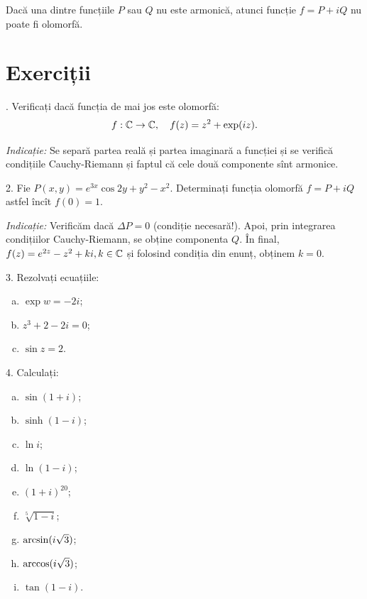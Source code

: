 \begin{corollary}\label{cor:not-olo}
  Dacă una dintre funcțiile $ P $ sau $ Q $ nu este armonică, atunci funcție
  $ f = P + iQ $ nu poate fi olomorfă.
\end{corollary}


\section{Exerciții}

\indent{}. Verificați dacă funcția de mai jos este olomorfă:
\[
  f : \mathbb{C} \to \mathbb{C}, \quad f(z) = z^2 + \exp(iz).
\]

\emph{Indicație:} Se separă partea reală și partea imaginară a funcției
și se verifică condițiile Cauchy-Riemann și faptul că cele două componente
sînt armonice.

\vspace{0.3cm}

2. Fie $ P(x, y) = e^{3x}\cos 2y + y^2 - x^2 $. Determinați funcția olomorfă
$ f = P + iQ $ astfel încît $ f(0) = 1 $.

\emph{Indicație:} Verificăm dacă $ \Delta P = 0 $ (condiție necesară!).
Apoi, prin integrarea condițiilor Cauchy-Riemann, se obține componenta
$ Q $. În final, $ f(z) = e^{2z} - z^2 + ki, k \in \mathbb{C} $ și folosind
condiția din enunț, obținem $ k = 0 $.

\vspace{0.3cm}

3. Rezolvați ecuațiile:
\begin{enumerate}[(a)]
\item $ \exp w = -2i $;
\item $ z^3 + 2 - 2i = 0 $;
\item $ \sin z = 2 $.
\end{enumerate}

\vspace{0.3cm}

4. Calculați:
\begin{enumerate}[(a)]
\item $ \sin(1 + i) $;
\item $ \sinh(1 - i) $;
\item $ \ln i $;
\item $ \ln(1 - i) $;
\item $ (1 + i)^{20} $;
\item $ \sqrt[5]{1 - i} $;
\item $ \mathrm{arcsin}(i\sqrt{3}) $;
\item $ \mathrm{arccos}(i\sqrt{3}) $;
\item $ \tan(1 - i) $.
\end{enumerate}

